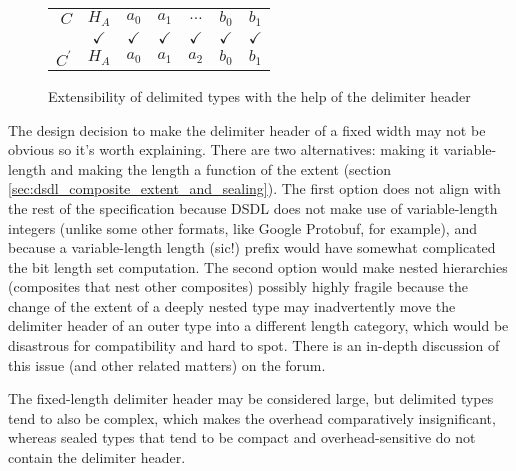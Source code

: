 \begin{remark}
    \begin{figure}[H]
        \centering
        \begin{tabular}{r c c c c c c}
            \cline{2-7}
            $C$ &
            \multicolumn{1}{|c|}{$H_A$} & \multicolumn{1}{c|}{$a_0$} & \multicolumn{1}{c|}{$a_1$}
            &\multicolumn{1}{c|}{\footnotesize{$\ldots$}}
            &\multicolumn{1}{c|}{$b_0$} & \multicolumn{1}{c|}{$b_1$}
            \\\cline{2-7}
            & $\checkmark$ & $\checkmark$ & $\checkmark$ & $\checkmark$ & $\checkmark$ & $\checkmark$ \\
            \cline{2-7}
            $C^\prime$ &
            \multicolumn{1}{|c|}{$H_A$} & \multicolumn{1}{c|}{$a_0$} & \multicolumn{1}{c|}{$a_1$} &
            \multicolumn{1}{c|}{$a_2$}
            &\multicolumn{1}{c|}{$b_0$} & \multicolumn{1}{c|}{$b_1$}
            \\\cline{2-7}
        \end{tabular}
        \caption{Extensibility of delimited types with the help of the delimiter header}
        \label{fig:dsdl_non_sealed_extensibility}
    \end{figure}

    The design decision to make the delimiter header of a fixed width may not be obvious so it's worth explaining.
    There are two alternatives: making it variable-length and making the length a function of the extent
    (section \ref{sec:dsdl_composite_extent_and_sealing}).
    The first option does not align with the rest of the specification because DSDL does not make use of
    variable-length integers (unlike some other formats, like Google Protobuf, for example),
    and because a variable-length length {\footnotesize{(sic!)}} prefix would have somewhat complicated the
    bit length set computation.
    The second option would make nested hierarchies (composites that nest other composites) possibly highly fragile
    because the change of the extent of a deeply nested type may inadvertently move the delimiter header of an
    outer type into a different length category, which would be disastrous for compatibility and hard to spot.
    There is an in-depth discussion of this issue (and other related matters) on the forum.

    The fixed-length delimiter header may be considered large,
    but delimited types tend to also be complex, which makes the overhead comparatively insignificant,
    whereas sealed types that tend to be compact and overhead-sensitive do not contain the delimiter header.
\end{remark}


